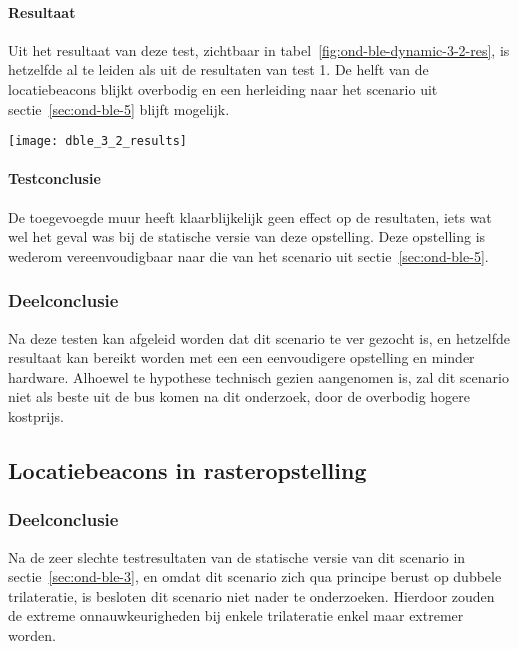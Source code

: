 \paragraph{Resultaat}
\begin{minipage}{0.42\textwidth}
Uit het resultaat van deze test, zichtbaar in tabel~\ref{fig:ond-ble-dynamic-3-2-res}, is hetzelfde al te leiden als uit de resultaten van test 1. De helft van de locatiebeacons blijkt overbodig en een herleiding naar het scenario uit sectie~\ref{sec:ond-ble-5} blijft mogelijk.
\end{minipage}
\hfill
\begin{minipage}{0.55\textwidth}
	\texttt{[image: dble\_3\_2\_results]}
	\label{fig:ond-ble-dynamic-3-2-res}
\end{minipage}

\paragraph{Testconclusie}
De toegevoegde muur heeft klaarblijkelijk geen effect op de resultaten, iets wat wel het geval was bij de statische versie van deze opstelling. Deze opstelling is wederom vereenvoudigbaar naar die van het scenario uit sectie~\ref{sec:ond-ble-5}.

\subsubsection{Deelconclusie}
Na deze testen kan afgeleid worden dat dit scenario te ver gezocht is, en hetzelfde resultaat kan bereikt worden met een een eenvoudigere opstelling en minder hardware. Alhoewel te hypothese technisch gezien aangenomen is, zal dit scenario niet als beste uit de bus komen na dit onderzoek, door de overbodig hogere kostprijs.

\subsection{Locatiebeacons in rasteropstelling}
\label{sec:ond-ble-7}
\subsubsection{Deelconclusie}
Na de zeer slechte testresultaten van de statische versie van dit scenario in sectie~\ref{sec:ond-ble-3}, en omdat dit scenario zich qua principe berust op dubbele trilateratie, is besloten dit scenario niet nader te onderzoeken. Hierdoor zouden de extreme onnauwkeurigheden bij enkele trilateratie enkel maar extremer worden. 

